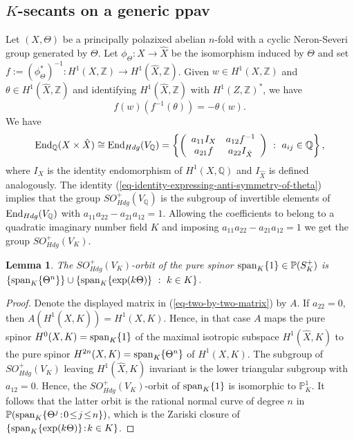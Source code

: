 \documentclass[12pt]{amsart}
\numberwithin{equation}{subsection}
\theoremstyle{plain}
\newtheorem{lem}[thm]{Lemma}
\theoremstyle{definition}
\newcommand{\QQ}{{\mathbb Q}}
\newcommand{\ZZ}{{\mathbb Z}}
\newcommand{\PP}{{\mathbb P}}
\newcommand{\End}{{\rm End}}
\renewcommand{\span}{{\rm span}}
\begin{document}
\subsection{$K$-secants on a generic ppav}
\label{sec-K-secants-on-the-generic-ppav}
Let $(X,\Theta)$ be a principally polazixed abelian $n$-fold with a cyclic Neron-Severi group generated by $\Theta$. Let $\phi_\Theta:X\rightarrow \hat{X}$ be the isomorphism induced by $\Theta$ and set $f:=(\phi_{\Theta}^*)^{-1}:H^1(X,\ZZ)\rightarrow H^1(\hat{X},\ZZ)$. Given $w\in H^1(X,\ZZ)$ and $\theta\in H^1(\hat{X},\ZZ)$ and identifying $H^1(\hat{X},\ZZ)$ with $H^1(Z,\ZZ)^*$, we have
\begin{equation}
\label{eq-identity-expressing-anti-symmetry-of-theta}
f(w)(f^{-1}(\theta))=-\theta(w).
\end{equation}
We have 
\begin{equation}
\label{eq-two-by-two-matrix}
\End_\QQ(X\times\hat{X})\cong \End_{Hdg}(V_\QQ)=
\left\{\left(
\begin{array}{cc}
a_{11}I_X & a_{12}f^{-1}
\\
a_{21}f & a_{22}I_{\hat{X}}
\end{array}
\right) \ : \ a_{ij}\in\QQ
\right\},
\end{equation}
where $I_X$ is the identity endomorphism of $H^1(X,\QQ)$  and $I_{\hat{X}}$ is defined analogously. 
The identity (\ref{eq-identity-expressing-anti-symmetry-of-theta}) implies that 
the group $SO^+_{Hdg}(V_\QQ)$ is the subgroup of invertible elements of $\End_{Hdg}(V_\QQ)$
with $a_{11}a_{22}-a_{21}a_{12}=1.$ 
Allowing the coefficients to belong to a quadratic imaginary number field $K$ and imposing $a_{11}a_{22}-a_{21}a_{12}=1$ 
we get the group $SO^+_{Hdg}(V_K)$.

\begin{lem}
\label{lemma-orbit-of-pure-spinors}
The $SO^+_{Hdg}(V_K)$-orbit of the pure spinor $\span_K\{1\}\in \PP(S^+_K)$ is \\
$\{\span_K\{\Theta^n\}\}\cup \{\span_K\{\exp(k\Theta)\} \ : \ k\in K
\}$.
\end{lem} 

\begin{proof}
Denote the displayed matrix in (\ref{eq-two-by-two-matrix}) by $A$. If  $a_{22}=0$, then $A(H^1(\hat{X},K))=H^1(X,K)$.
Hence, in that case $A$ maps the pure spinor $H^0(X,K)=\span_K\{1\}$ of the maximal isotropic subspace $H^1(\hat{X},K)$ to the pure spinor $H^{2n}(X,K)=\span_K\{\Theta^n\}$
of $H^1(X,K)$. 
The subgroup of $SO^+_{Hdg}(V_K)$ leaving $H^1(\hat{X},K)$ invariant is the lower triangular subgroup with $a_{12}=0$. Hence, the $SO^+_{Hdg}(V_K)$-orbit
of $\span_K\{1\}$ is isomorphic to $\PP^1_K$. It follows that the latter orbit is the
rational normal curve of degree $n$ in $\PP(\span_K\{\Theta^j\! : \! 0\!\leq\! j \!\leq\! n\})$, which is 
the Zariski closure
of $\{\span_K\{\exp(k\Theta)\} \! : \! k\in K\}$.
\end{proof}
\end{document}
